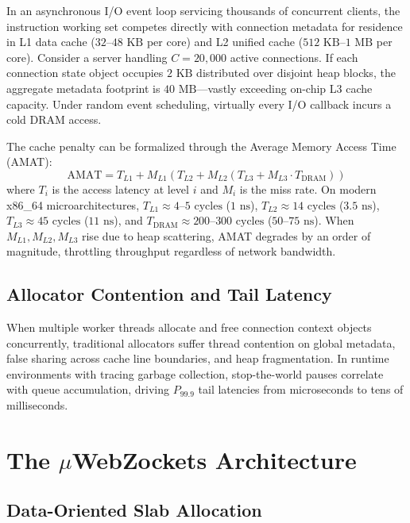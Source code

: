 \documentclass[journal]{IEEEtran}
\begin{document}
In an asynchronous I/O event loop servicing thousands of concurrent clients, the instruction working set competes directly with connection metadata for residence in L1 data cache ($32\text{--}48\text{ KB}$ per core) and L2 unified cache ($512\text{ KB}\text{--}1\text{ MB}$ per core). Consider a server handling $C = 20{,}000$ active connections. If each connection state object occupies $2\text{ KB}$ distributed over disjoint heap blocks, the aggregate metadata footprint is $40\text{ MB}$---vastly exceeding on-chip L3 cache capacity. Under random event scheduling, virtually every I/O callback incurs a cold DRAM access.

The cache penalty can be formalized through the Average Memory Access Time (AMAT):
\begin{equation}
\text{AMAT} = T_{L1} + M_{L1}(T_{L2} + M_{L2}(T_{L3} + M_{L3} \cdot T_{\text{DRAM}}))
\end{equation}
where $T_i$ is the access latency at level $i$ and $M_i$ is the miss rate. On modern x86\_64 microarchitectures, $T_{L1} \approx 4\text{--}5\text{ cycles}$ ($1\text{ ns}$), $T_{L2} \approx 14\text{ cycles}$ ($3.5\text{ ns}$), $T_{L3} \approx 45\text{ cycles}$ ($11\text{ ns}$), and $T_{\text{DRAM}} \approx 200\text{--}300\text{ cycles}$ ($50\text{--}75\text{ ns}$). When $M_{L1}, M_{L2}, M_{L3}$ rise due to heap scattering, AMAT degrades by an order of magnitude, throttling throughput regardless of network bandwidth.

\subsection{Allocator Contention and Tail Latency}

When multiple worker threads allocate and free connection context objects concurrently, traditional allocators suffer thread contention on global metadata, false sharing across cache line boundaries, and heap fragmentation. In runtime environments with tracing garbage collection, stop-the-world pauses correlate with queue accumulation, driving $P_{99.9}$ tail latencies from microseconds to tens of milliseconds.

\section{The \ensuremath{\mu}WebZockets Architecture}

\subsection{Data-Oriented Slab Allocation}
\end{document}
